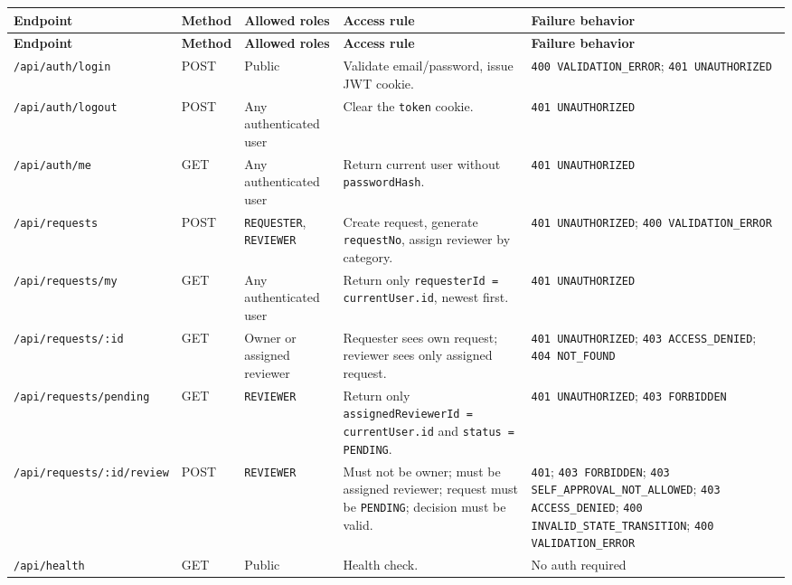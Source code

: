 \documentclass[11pt,a4paper]{article}
\begin{document}
\vspace{0.3em}
\begin{longtable}{|>{\RaggedRight}p{3.5cm}|>{\centering\arraybackslash}p{1.4cm}|>{\RaggedRight}p{2.2cm}|>{\RaggedRight}p{5.2cm}|>{\RaggedRight}p{3.5cm}|}
\hline
\rowcolor{zenPale}\textbf{Endpoint} & \textbf{Method} & \textbf{Allowed roles} & \textbf{Access rule} & \textbf{Failure behavior} \\ \hline
\endfirsthead
\hline
\rowcolor{zenPale}\textbf{Endpoint} & \textbf{Method} & \textbf{Allowed roles} & \textbf{Access rule} & \textbf{Failure behavior} \\ \hline
\endhead
\hline
\endfoot
\texttt{/\allowbreak api/\allowbreak auth/\allowbreak login} & POST & Public & Validate email/password, issue JWT cookie. & \texttt{400 VALIDATION\_\allowbreak ERROR}; \texttt{401 UNAUTHORIZED} \\ \hline
\texttt{/\allowbreak api/\allowbreak auth/\allowbreak logout} & POST & Any authenticated user & Clear the \texttt{token} cookie. & \texttt{401 UNAUTHORIZED} \\ \hline
\texttt{/\allowbreak api/\allowbreak auth/\allowbreak me} & GET & Any authenticated user & Return current user without \texttt{passwordHash}. & \texttt{401 UNAUTHORIZED} \\ \hline
\texttt{/\allowbreak api/\allowbreak requests} & POST & \texttt{REQUESTER}, \texttt{REVIEWER} & Create request, generate \texttt{requestNo}, assign reviewer by category. & \texttt{401 UNAUTHORIZED}; \texttt{400 VALIDATION\_\allowbreak ERROR} \\ \hline
\texttt{/\allowbreak api/\allowbreak requests/\allowbreak my} & GET & Any authenticated user & Return only \texttt{requesterId = currentUser.\allowbreak id}, newest first. & \texttt{401 UNAUTHORIZED} \\ \hline
\texttt{/\allowbreak api/\allowbreak requests/\allowbreak :\allowbreak id} & GET & Owner or assigned reviewer & Requester sees own request; reviewer sees only assigned request. & \texttt{401 UNAUTHORIZED}; \texttt{403 ACCESS\_\allowbreak DENIED}; \texttt{404 NOT\_\allowbreak FOUND} \\ \hline
\texttt{/\allowbreak api/\allowbreak requests/\allowbreak pending} & GET & \texttt{REVIEWER} & Return only \texttt{assignedReviewerId = currentUser.\allowbreak id} and \texttt{status = PENDING}. & \texttt{401 UNAUTHORIZED}; \texttt{403 FORBIDDEN} \\ \hline
\texttt{/\allowbreak api/\allowbreak requests/\allowbreak :\allowbreak id/\allowbreak review} & POST & \texttt{REVIEWER} & Must not be owner; must be assigned reviewer; request must be \texttt{PENDING}; decision must be valid. & \texttt{401}; \texttt{403 FORBIDDEN}; \texttt{403 SELF\_\allowbreak APPROVAL\_\allowbreak NOT\_\allowbreak ALLOWED}; \texttt{403 ACCESS\_\allowbreak DENIED}; \texttt{400 INVALID\_\allowbreak STATE\_\allowbreak TRANSITION}; \texttt{400 VALIDATION\_\allowbreak ERROR} \\ \hline
\texttt{/\allowbreak api/\allowbreak health} & GET & Public & Health check. & No auth required \\ \hline
\end{longtable}
\vspace{0.3em}
\end{document}
